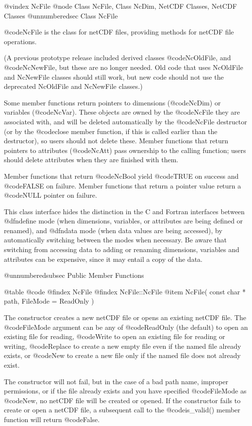 @vindex NcFile
@node Class NcFile, Class NcDim, NetCDF Classes, NetCDF Classes
@unnumberedsec  Class NcFile

@code{NcFile} is the class for netCDF files,
providing methods for netCDF file operations.

(A previous prototype release included derived classes @code{NcOldFile},
and @code{NcNewFile}, but these are no longer needed.  Old code that
uses NcOldFile and NcNewFile classes should still work, but new code
should not use the deprecated NcOldFile and NcNewFile classes.)

Some member functions return pointers to dimensions (@code{NcDim}) or
variables (@code{NcVar}).  These objects are owned by the @code{NcFile}
they are associated with, and will be deleted automatically by the
@code{NcFile} destructor (or by the @code{close} member function, if
this is called earlier than the destructor), so users should not delete
these.  Member functions that return pointers to attributes
(@code{NcAtt}) pass ownership to the calling function; users
should delete attributes when they are finished with them.  

Member functions that return @code{NcBool} yield @code{TRUE} on success
and @code{FALSE} on failure.  Member functions that return a pointer
value return a @code{NULL} pointer on failure.

This class interface hides the distinction in the C and Fortran
interfaces between @dfn{define mode} (when dimensions, variables, or
attributes are being defined or renamed), and @dfn{data mode} (when data
values are being accessed), by automatically switching between the modes
when necessary.  Be aware that switching from accessing data to adding
or renaming dimensions, variables and attributes can be expensive, since
it may entail a copy of the data.

@unnumberedsubsec Public Member Functions

@table @code
@findex NcFile
@findex NcFile::NcFile
@item NcFile( const char * path, FileMode = ReadOnly )

The constructor creates a new netCDF file or opens an existing netCDF
file.  The @code{FileMode} argument can be any of @code{ReadOnly} (the
default) to open an existing file for reading, @code{Write} to open an
existing file for reading or writing, @code{Replace} to create a new
empty file even if the named file already exists, or
@code{New} to create a new file only if the named file does not already
exist.

The constructor will not fail, but in the case of a bad path name,
improper permissions, or if the file already exists and you have
specified @code{FileMode} as @code{New}, no netCDF file will be created
or opened.  If the constructor fails to create or open a netCDF file, a
subsequent call to the @code{is_valid()} member function will return
@code{False}.

